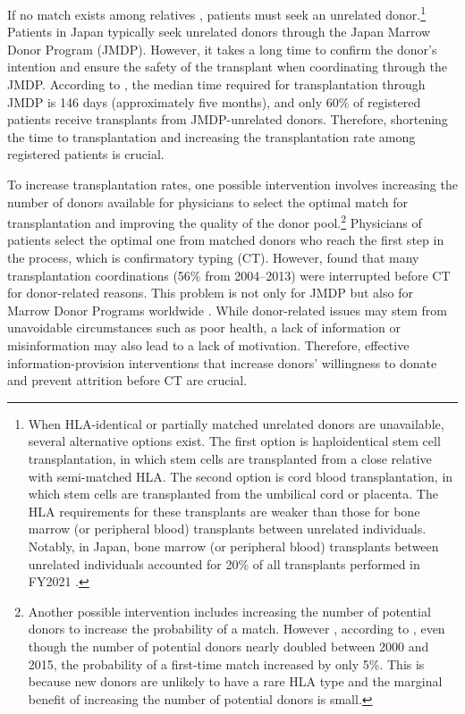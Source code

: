 \documentclass [12pt, a4paper]{article}
\begin{document}
If  no match exists among relatives , patients must seek an unrelated donor.\footnote{When HLA-identical or partially matched unrelated donors are unavailable, several alternative options exist. The first option is haploidentical stem cell transplantation, in which stem cells are transplanted from a close relative with semi-matched HLA. The second option is cord blood transplantation, in which  stem cells are transplanted from the umbilical cord or placenta. The HLA requirements for these transplants are weaker than those for bone marrow (or peripheral blood) transplants between unrelated individuals. Notably, in Japan, bone marrow (or peripheral blood) transplants between unrelated individuals accounted for 20\% of all transplants performed in FY2021 \citep{JapaneseDataCenterf2022}.} Patients in Japan typically seek unrelated donors through the Japan Marrow Donor Program (JMDP). However, it takes a long time to confirm the donor's intention and ensure the safety of the transplant when coordinating through the JMDP. According to \citet{Hirakawa2018}, the median time required for transplantation through JMDP is 146 days (approximately five months), and only 60\% of registered patients receive transplants from JMDP-unrelated donors. Therefore, shortening the time to transplantation and increasing the transplantation rate among registered patients is crucial.

To increase transplantation rates, one possible intervention involves increasing the number of donors available for physicians to select the optimal match for transplantation and improving the quality of the donor pool.\footnote{Another possible  intervention includes increasing the number of potential donors to increase the probability of a match. However , according to \citet{Takanashi2016}, even though the number of potential donors nearly doubled between 2000 and 2015, the probability of a first-time match increased by only 5\%. This is because new donors are unlikely to have a rare HLA type and the marginal benefit of increasing the number of potential donors is small.} Physicians of patients select the optimal one from matched donors who reach the first step in the process, which is confirmatory typing (CT). However, \citet{Hirakawa2018} found that many transplantation coordinations (56\% from 2004--2013) were interrupted before CT for donor-related reasons. This problem is not only for JMDP but also for Marrow Donor Programs worldwide \citep{Haylock2024}. While donor-related issues may stem from unavoidable circumstances such as poor health, a lack of information or misinformation may also lead to a lack of motivation. Therefore, effective information-provision interventions that increase donors' willingness to donate and prevent attrition before CT are crucial. 
\end{document}
